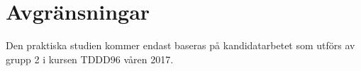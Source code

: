 
\section{Avgränsningar}
\label{sec:delimitations}

Den praktiska studien kommer endast baseras på kandidatarbetet som utförs av
grupp 2 i kursen TDDD96 våren 2017.





